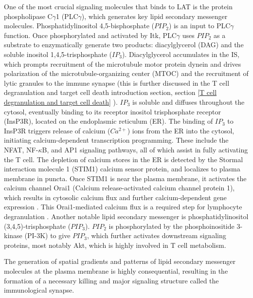 One of the most crucial signaling molecules that binds to LAT is the protein phospholipase C$\gamma$1 (PLC$\gamma$), which generates key lipid secondary messenger molecules. Phosphatidylinositol 4,5-bisphosphate ($PIP_{2}$) is an input to PLC$\gamma$ function. Once phosphorylated and activated by Itk, PLC$\gamma$ uses $PIP_{2}$ as a substrate to enzymatically generate two products: diacylglycerol (DAG) and the soluble inositol 1,4,5-trisphosphate ($IP_{3}$). Diacylglycerol accumulates in the IS, which prompts recruitment of the microtubule motor protein dynein and drives polarization of the microtubule-organizing center (MTOC) \cite{Quann2009} and the recruitment of lytic granules to the immune synapse (this is further discussed in the T cell degranulation and target cell death introduction section, section \ref{T cell degranulation and target cell death} \cite{Stinchcombe2006}). $IP_{3}$ is soluble and diffuses throughout the cytosol, eventually binding to its receptor inositol trisphosphate receptor (InsP3R), located on the endoplasmic reticulum (ER). The binding of $IP_{3}$ to InsP3R triggers release of calcium ($Ca^{2+}$) ions from the ER into the cytosol, initiating calcium-dependent transcription programming. These include the NFAT, NF-$\kappa$B, and AP1 signaling pathways, all of which assist in fully activating the T cell. The depletion of calcium stores in the ER is detected by the Stormal interaction molecule 1 (STIM1) calcium sensor protein, and localizes to plasma membrane in puncta. Once STIM1 is near the plasma membrane, it activates the calcium channel Orai1 (Calcium release-activated calcium channel protein 1), which results in cytosolic calcium flux and further calcium-dependent gene expression \cite{Lunz2019}. This Orai1-mediated calcium flux is a required step for lymphocyte degranulation \cite{Maul-Pavicic2011}. Another notable lipid secondary messenger is phosphatidylinositol (3,4,5)-trisphosphate ($PIP_{3}$). $PIP_{2}$ is phosphorylated by the phosphoinositide 3-kinase (PI-3K) to give $PIP_{3}$, which further activates downstream signaling proteins, most notably Akt, which is highly involved in T cell metabolism.

The generation of spatial gradients and patterns of lipid secondary messenger molecules at the plasma membrane is highly consequential, resulting in the formation of a necessary killing and major signaling structure called the immunological synapse. 

